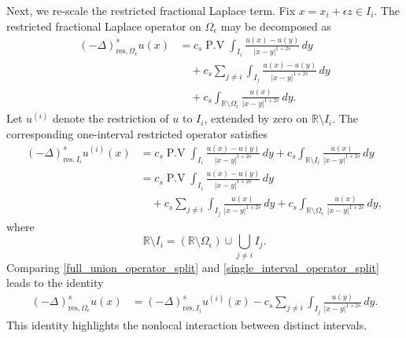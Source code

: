 \documentclass[preprint,12pt]{elsarticle}
\newcommand{\R}{\mathbb R}
\newcommand{\pv}{\operatorname{P.V}}
\begin{document}
Next, we re-scale the restricted fractional Laplace term. 
Fix $x=x_i+\epsilon z\in I_i$. The restricted fractional Laplace operator on $\Omega_\epsilon$
may be decomposed as
\begin{align}
(-\Delta)^s_{\mathrm{res},\Omega_\epsilon}u(x)
&=
c_s\pv\int_{I_i}
\frac{u(x)-u(y)}{|x-y|^{1+2s}}\,dy\nonumber\\
&\quad+
c_s\sum_{j\neq i}\int_{I_j}
\frac{u(x)-u(y)}{|x-y|^{1+2s}}\,dy\nonumber\\
&\quad+
c_s\int_{\R\setminus\Omega_\epsilon}
\frac{u(x)}{|x-y|^{1+2s}}\,dy.
\label{full_union_operator_split}
\end{align}
Let $u^{(i)}$ denote the restriction of $u$ to $I_i$, extended by zero
on $\R\setminus I_i$. The corresponding one-interval restricted
operator satisfies
\begin{align}
(-\Delta)^s_{\mathrm{res},I_i}u^{(i)}(x)
&=
c_s\pv\int_{I_i}
\frac{u(x)-u(y)}{|x-y|^{1+2s}}\,dy
+
c_s\int_{\R\setminus I_i}
\frac{u(x)}{|x-y|^{1+2s}}\,dy\nonumber\\
&=
c_s\pv\int_{I_i}
\frac{u(x)-u(y)}{|x-y|^{1+2s}}\,dy\nonumber\\
&\quad+
c_s\sum_{j\neq i}\int_{I_j}
\frac{u(x)}{|x-y|^{1+2s}}\,dy
+
c_s\int_{\R\setminus\Omega_\epsilon}
\frac{u(x)}{|x-y|^{1+2s}}\,dy,
\label{single_interval_operator_split}
\end{align}
where
\[
    \R\setminus I_i
    =
    (\R\setminus\Omega_\epsilon)
    \cup\bigcup_{j\neq i}I_j.
\]
Comparing \eqref{full_union_operator_split} and
\eqref{single_interval_operator_split} leads to the identity
\begin{align}
(-\Delta)^s_{\mathrm{res},\Omega_\epsilon}u(x)
&=
(-\Delta)^s_{\mathrm{res},I_i}u^{(i)}(x)
-
c_s\sum_{j\neq i}\int_{I_j}
\frac{u(y)}{|x-y|^{1+2s}}\,dy.
\label{union_operator_single_interval_identity}
\end{align}
This identity highlights the nonlocal interaction between
distinct intervals.
\end{document}

